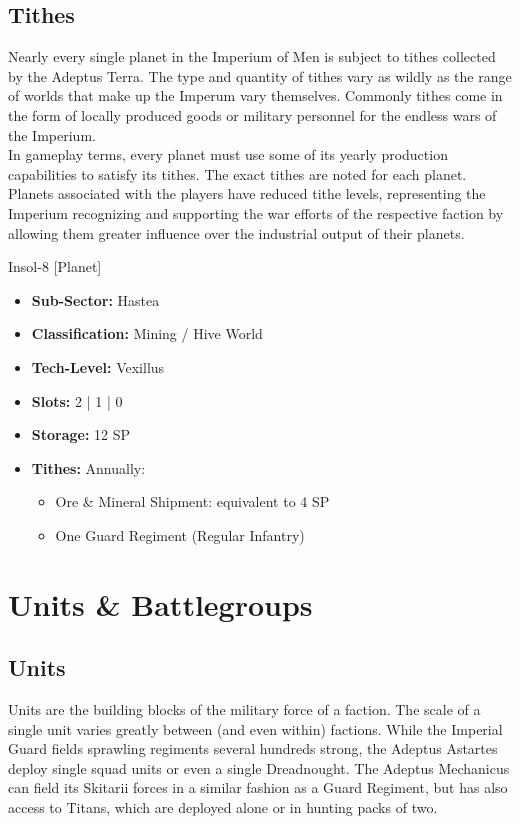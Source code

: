 \section{Tithes}
Nearly every single planet in the Imperium of Men is subject to tithes collected by the Adeptus Terra. 
The type and quantity of tithes vary as wildly as the range of worlds that make up the Imperum vary themselves.
Commonly tithes come in the form of locally produced goods or military personnel for the endless wars of the Imperium.\\
In gameplay terms, every planet must use some of its yearly production capabilities to satisfy its tithes. The exact tithes are noted for each planet. 
Planets associated with the players have reduced tithe levels, representing the Imperium recognizing and supporting the war efforts of the respective faction by allowing them greater influence over the industrial output of their planets.
\begin{DndSidebar}{Insol-8 [Planet]}
\begin{itemize}
	\item \textbf{Sub-Sector:} Hastea
	\item \textbf{Classification:} Mining / Hive World
	\item \textbf{Tech-Level:} Vexillus
	\item \textbf{Slots:} 2 | 1 | 0
	\item \textbf{Storage:} 12 SP
	\item \textbf{Tithes:} Annually:
	\begin{itemize}
		\item Ore \& Mineral Shipment: equivalent to 4 SP
		\item One Guard Regiment (Regular Infantry)
	\end{itemize}
\end{itemize}
\end{DndSidebar}

\chapter{Units \& Battlegroups}
\section{Units}
Units are the building blocks of the military force of a faction. The scale of a single unit varies greatly between (and even within) factions. While the Imperial Guard fields sprawling regiments several hundreds strong, the Adeptus Astartes deploy single squad units or even a single Dreadnought. The Adeptus Mechanicus can field its Skitarii forces in a similar fashion as a Guard Regiment, but has also access to Titans, which are deployed alone or in hunting packs of two.

